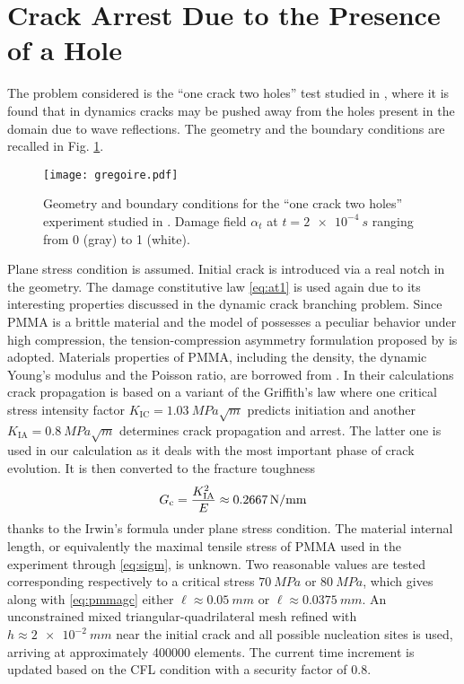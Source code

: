 \section{Crack Arrest Due to the Presence of a Hole} \label{sec:gregoire}
The problem considered is the ``one crack two holes'' test studied in \cite{HaboussaGregoireElguedjMaigreCombescure:2011}, where it is found that in dynamics cracks may be pushed away from the holes present in the domain due to wave reflections. The geometry and the boundary conditions are recalled in Fig. \ref{fig:gregoire}.
\begin{figure}[htbp]
\centering
\texttt{[image: gregoire.pdf]}
\caption{Geometry and boundary conditions for the ``one crack two holes'' experiment studied in \cite{HaboussaGregoireElguedjMaigreCombescure:2011}. Damage field $\alpha_t$ at $t=\SI{2e-4}{s}$ ranging from 0 (gray) to 1 (white).} \label{fig:gregoire}
\end{figure}
Plane stress condition is assumed. Initial crack is introduced via a real notch in the geometry. The damage constitutive law \eqref{eq:at1} is used again due to its interesting properties discussed in the dynamic crack branching problem. Since PMMA is a brittle material \cite{GregoireMaigreRethoreCombescure:2007} and the model of \cite{MieheHofackerWelschinger:2010} possesses a peculiar behavior under high compression, the tension-compression asymmetry formulation proposed by \cite{FreddiRoyer-Carfagni:2010} is adopted. Materials properties of PMMA, including the density, the dynamic Young's modulus and the Poisson ratio, are borrowed from \cite{HaboussaGregoireElguedjMaigreCombescure:2011}. In their calculations crack propagation is based on a variant of the Griffith's law where one critical stress intensity factor $K_\mathrm{IC}=\SI{1.03}{MPa\sqrt{m}}$ predicts initiation and another $K_\mathrm{IA}=\SI{0.8}{MPa\sqrt{m}}$ determines crack propagation and arrest. The latter one is used in our calculation as it deals with the most important phase of crack evolution. It is then converted to the fracture toughness
\begin{equation} \label{eq:pmmagc}
G_\mathrm{c}=\frac{K_\mathrm{IA}^2}{E}\approx\SI{0.2667}{N/mm}
\end{equation}
thanks to the Irwin's formula under plane stress condition. The material internal length, or equivalently the maximal tensile stress of PMMA used in the experiment through \eqref{eq:sigm}, is unknown. Two reasonable values are tested corresponding respectively to a critical stress $\SI{70}{MPa}$ or $\SI{80}{MPa}$, which gives along with \eqref{eq:pmmagc} either $\ell\approx\SI{0.05}{mm}$ or $\ell\approx\SI{0.0375}{mm}$. An unconstrained mixed triangular-quadrilateral mesh refined with $h\approx\SI{2e-2}{mm}$ near the initial crack and all possible nucleation sites is used, arriving at approximately \num{400000} elements. The current time increment is updated based on the CFL condition with a security factor of 0.8.
